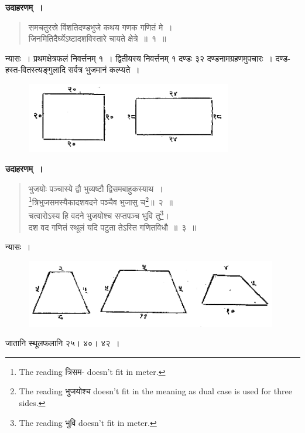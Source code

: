 \documentclass[11pt, openany]{book}
\begin{document}
\textbf{उदाहरणम्~। }
\begin{quote}
    \bqt 
    समचतुरस्रे विंशतिदण्डभुजे कथय गणक गणितं मे~।\\
जिनमितिदैर्घ्येऽष्टादशविस्तारे चायते क्षेत्रे~॥~१~॥
\end{quote}

 न्यासः~। प्रथमक्षेत्रफलं निवर्त्तनम् १~। द्वितीयस्य निवर्त्तनम् १
दण्डः ३२ दण्डनामग्रहणमुपचारः~। दण्ड-हस्त-वितस्त्यङ्गुलादि सर्वत्र भुजमानं कल्प्यते~। 
\newpage
\setcounter{footnote}{0}
 \begin{figure}[h!]
    \centering
    \includegraphics[width=90mm]{graphics/capture1.png}
\end{figure}

\textbf{उदाहरणम्~। }
\begin{quote}
    \bqt 
    भुजयोः पञ्चास्ये द्वौ भुव्यष्टौ द्विसमबाहुकस्याथ~।\\
\footnote{The reading त्रिसम- doesn't fit in meter.}त्रिभुजसमस्यैकादशवदने पञ्चैव भुजासु च\footnote{The reading भुजयोश्च doesn't fit in the meaning as dual case is used for three sides.}॥~२~॥ \\
चत्वारोऽस्य हि वदने भुजयोश्च सप्तपञ्च भुवि तु\footnote{The reading भुवि doesn't fit in meter.}।\\
दश वद गणितं स्थूलं यदि पटुता तेऽस्ति गणितविधौ~॥~३~॥
\end{quote}

 न्यासः~। 
 
\begin{figure}[h!]
    \centering
    \includegraphics[width=110mm]{graphics/capture2.png}
\end{figure}
\vspace{-2mm}

 जातानि स्थूलफलानि २५। ४०। ४२~। \\
\vspace{-2mm}
\end{document}
